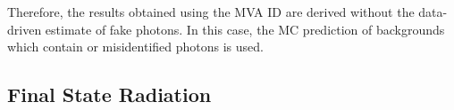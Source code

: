 
Therefore, the results obtained using the MVA ID are derived without the data-driven estimate of fake photons.
In this case, the MC prediction of backgrounds which contain \nonprompt or misidentified photons is used.

\subsection{Final State Radiation}
